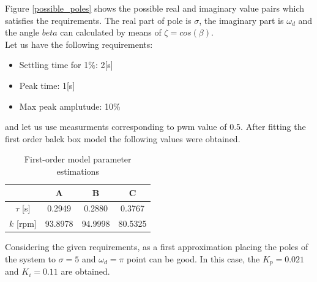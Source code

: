 \documentclass[12pt,english,twoside]{article}
\begin{document}
Figure \ref{possible_poles} shows the possible real and imaginary value pairs which satisfies the requirements. The real part of pole is $\sigma$, the imaginary part is $\omega_d$ and the angle $beta$ can calculated by means of $\zeta = cos(\beta)$. \\[2mm]
\newpage
\noindent Let us have the following requirements:
\begin{itemize}
	\item Settling time for 1$\%$: 2[s]
	\item Peak time: 1[s]
	\item Max peak amplutude: 10\%
\end{itemize}
\noindent and let us use measurments corresponding to pwm value of 0.5. After fitting the first order balck box model the following values were obtained.
\begin{table}[h]
	\centering
	\label{first_order_model_table_50}
	\begin{tabular}{cccc}
		\hline
		& A  		& B  		& C   		\\ \hline
		$\tau$ {[}s{]} 		& 0.2949 	& 0.2880 	& 0.3767 	 \\
		$k$ {[}rpm{]}       & 93.8978 	& 94.9998 	& 80.5325   	\\ \hline
	\end{tabular}
	\caption{First-order model parameter estimations}
\end{table}
Considering the given requirements, as a first approximation placing the poles of the system to $\sigma = 5$ and $\omega_d = \pi$ point can be good.
In this case, the $K_p = 0.021$ and $K_i = 0.11$ are obtained.
\end{document}
